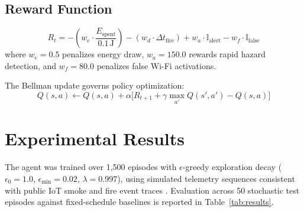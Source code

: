 \documentclass[10pt,twocolumn]{article}
\begin{document}
\subsection{Reward Function}

\begin{equation}
R_t = -\left(w_e \cdot \frac{E_{\text{spent}}}{0.1\,\text{J}}\right) - \left(w_d \cdot \Delta t_{\text{fire}}\right) + w_a \cdot \mathbb{I}_{\text{alert}} - w_f \cdot \mathbb{I}_{\text{false}}
\label{eq:reward}
\end{equation}
where $w_e = 0.5$ penalizes energy draw, $w_a = 150.0$ rewards rapid hazard detection, and $w_f = 80.0$ penalizes false Wi-Fi activations.

The Bellman update governs policy optimization:
\begin{equation}
Q(s,a) \leftarrow Q(s,a) + \alpha\big[R_{t+1} + \gamma \max_{a'} Q(s',a') - Q(s,a)\big]
\label{eq:bellman}
\end{equation}

\section{Experimental Results}

The agent was trained over 1{,}500 episodes with $\epsilon$-greedy exploration decay ($\epsilon_0 = 1.0$, $\epsilon_{\min} = 0.02$, $\lambda = 0.997$), using simulated telemetry sequences consistent with public IoT smoke and fire event traces \cite{b4}. Evaluation across 50 stochastic test episodes against fixed-schedule baselines is reported in Table~\ref{tab:results}.

\begin{table}[h]
\centering
\caption{Policy Performance and Energy Comparison}
\label{tab:results}
\end{table}
\end{document}
